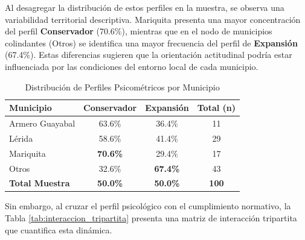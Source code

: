 \documentclass[11pt,a4paper]{article}
\begin{document}
\par
Al desagregar la distribución de estos perfiles en la muestra, se observa una variabilidad territorial descriptiva. Mariquita presenta una mayor concentración del perfil \textbf{Conservador} (70.6\%), mientras que en el nodo de municipios colindantes (Otros) se identifica una mayor frecuencia del perfil de \textbf{Expansión} (67.4\%). Estas diferencias sugieren que la orientación actitudinal podría estar influenciada por las condiciones del entorno local de cada municipio.

\begin{table}[H]
\centering
\caption{Distribución de Perfiles Psicométricos por Municipio}
\small
\begin{tabular}{@{}lccc@{}}
\toprule
\textbf{Municipio} & \textbf{Conservador} & \textbf{Expansi\'on} & \textbf{Total (n)} \\ \midrule
Armero Guayabal & 63.6\% & 36.4\% & 11 \\
Lérida & 58.6\% & 41.4\% & 29 \\
Mariquita & \textbf{70.6\%} & 29.4\% & 17 \\
Otros & 32.6\% & \textbf{67.4\%} & 43 \\ \midrule
\textbf{Total Muestra} & \textbf{50.0\%} & \textbf{50.0\%} & \textbf{100} \\ \bottomrule
\end{tabular}
\end{table}

\par
Sin embargo, al cruzar el perfil psicológico con el cumplimiento normativo, la Tabla \ref{tab:interaccion_tripartita} presenta una matriz de interacción tripartita que cuantifica esta dinámica.
\end{document}
